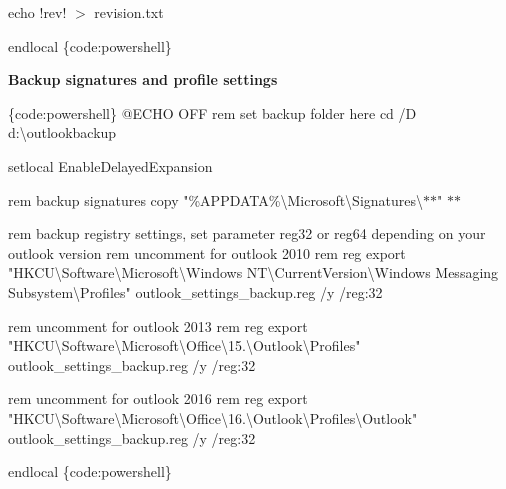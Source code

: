 echo !rev! \texorpdfstring{$>$}{>} revision.\+txt

endlocal \{code\+:powershell\}

{\bfseries{Backup signatures and profile settings}}

\{code\+:powershell\} @\+ECHO OFF rem set backup folder here cd /D d\+:\textbackslash{}outlookbackup

setlocal Enable\+Delayed\+Expansion

rem backup signatures copy "{}\%\+APPDATA\%\textbackslash{}\+Microsoft\textbackslash{}\+Signatures\textbackslash{}\texorpdfstring{$\ast$}{*}\texorpdfstring{$\ast$}{*}"{} \texorpdfstring{$\ast$}{*}\texorpdfstring{$\ast$}{*}

rem backup registry settings, set parameter reg32 or reg64 depending on your outlook version rem uncomment for outlook 2010 rem reg export "{}\+HKCU\textbackslash{}\+Software\textbackslash{}\+Microsoft\textbackslash{}\+Windows NT\textbackslash{}\+Current\+Version\textbackslash{}\+Windows Messaging Subsystem\textbackslash{}\+Profiles"{} outlook\+\_\+settings\+\_\+backup.\+reg /y /reg\+:32

rem uncomment for outlook 2013 rem reg export "{}\+HKCU\textbackslash{}\+Software\textbackslash{}\+Microsoft\textbackslash{}\+Office\textbackslash{}15.\textbackslash{}\+Outlook\textbackslash{}\+Profiles"{} outlook\+\_\+settings\+\_\+backup.\+reg /y /reg\+:32

rem uncomment for outlook 2016 rem reg export "{}\+HKCU\textbackslash{}\+Software\textbackslash{}\+Microsoft\textbackslash{}\+Office\textbackslash{}16.\textbackslash{}\+Outlook\textbackslash{}\+Profiles\textbackslash{}\+Outlook"{} outlook\+\_\+settings\+\_\+backup.\+reg /y /reg\+:32

endlocal \{code\+:powershell\} 